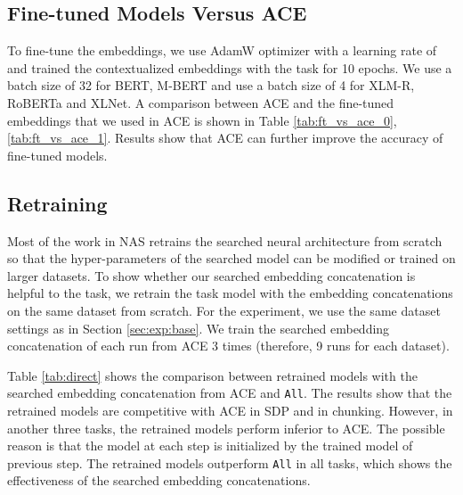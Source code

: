 \documentclass[11pt,a4paper]{article}
\begin{document}
\subsection{Fine-tuned Models Versus ACE}
\label{sec:finetune}
To fine-tune the embeddings, we use AdamW \citep{loshchilov2018decoupled} optimizer with a learning rate of  and trained the contextualized embeddings with the task for 10 epochs. We use a batch size of 32 for BERT, M-BERT and use a batch size of 4 for XLM-R, RoBERTa and XLNet. A comparison between ACE and the fine-tuned embeddings that we used in ACE is shown in Table \ref{tab:ft_vs_ace_0}, \ref{tab:ft_vs_ace_1}. Results show that ACE can further improve the accuracy of fine-tuned models. 


\subsection{Retraining}
Most of the work \citep{zoph2016neural,zoph2018learning,pham2018efficient,so2019evolved,zhu2020autotrans} in NAS retrains the searched neural architecture from scratch so that the hyper-parameters of the searched model can be modified or trained on larger datasets. To show whether our searched embedding concatenation is helpful to the task, we retrain the task model with the embedding concatenations on the same dataset from scratch. For the experiment, we use the same dataset settings as in Section \ref{sec:exp:base}. We train the searched embedding concatenation of each run from ACE 3 times (therefore, 9 runs for each dataset). 

Table \ref{tab:direct} shows the comparison between retrained models with the searched embedding concatenation from ACE and \texttt{All}. The results show that the retrained models are competitive with ACE in SDP and in chunking. However, in another three tasks, the retrained models perform inferior to ACE. The possible reason is that the model at each step is initialized by the trained model of previous step. The retrained models outperform \texttt{All} in all tasks, which shows the effectiveness of the searched embedding concatenations. 
\end{document}
